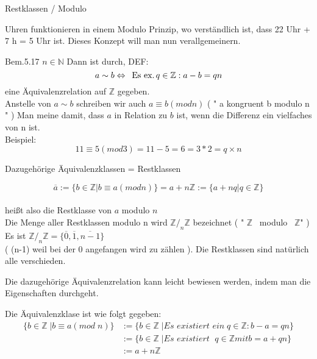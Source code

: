 \documentclass[headsepline,12pt,a4paper]{scrartcl}
\begin{document}
\begin{center}
\item[Restklassen / Modulo]
\end{center}
\item Uhren funktionieren in einem Modulo Prinzip, wo verständlich ist, dass 22 Uhr + 7 h = 5 Uhr ist. Dieses Konzept will man nun verallgemeinern. \\
\item Bem.5.17 $n \in \mathbb{N} $ Dann ist durch, DEF: \\

$$ a \sim b \Leftrightarrow \text{\, Es ex.} \, q \in \mathbb{Z} : a-b = qn $$
eine Äquivalenzrelation auf $\mathbb{Z}$ gegeben. \\
Anstelle von $ a \sim b $ schreiben wir auch $ a\equiv b ( mod n ) $ ( " a kongruent b modulo n " )
Man meine damit, dass $a$ in Relation zu $b$ ist, wenn die Differenz ein vielfaches von n ist. \\
Beispiel: $$ 11 \equiv 5 (mod 3 ) = 11 - 5 = 6 = 3 * 2 = q \times n $$ 

\begin{center}
\item[Dazugehörige Äquivalenzklassen = Restklassen]
\end{center}
\item $$ \overline{a} := \{b\in \mathbb{Z} | b \equiv a (mod n) \} = a + n \mathbb{Z} := \{a+nq|q\in \mathbb{Z}\} $$ \\
heißt also die Restklasse von $ a $ modulo $ n $ \\
Die Menge aller Restklassen modulo n wird $ \mathbb{Z} /_n \mathbb{Z} $ bezeichnet ( " $\mathbb{Z}$ \, modulo \, $ \mathbb{Z} $" ) \\
Es ist $ \mathbb{Z} /_n \mathbb{Z} = \{\overline{0},\overline{1},\overline{n-1}\} $ \\
( (n-1) weil bei der 0 angefangen wird zu zählen ). Die Restklassen sind natürlich alle verschieden.

\item Die dazugehörige Äquivalenzrelation kann leicht bewiesen werden, indem man die Eigenschaften durchgeht.
\item Die Äquivalenzklase ist wie folgt gegeben: 
\begin{equation} 
 \begin{aligned} 
  \{b \in \mathbb{Z} \; | b \equiv a ( mod \; n ) \} &:= \{b \in \mathbb{Z} \; | \textit{Es existiert ein} \; q \in \mathbb{Z} : b-a =qn \} \\
  &:= \{b \in \mathbb{Z} \; | \textit{Es existiert } \; q \in \mathbb{Z} mit b = a+qn \} \\
  &:= a+n\mathbb{Z}   
 \end{aligned} 
\end{equation} 
\end{document}
